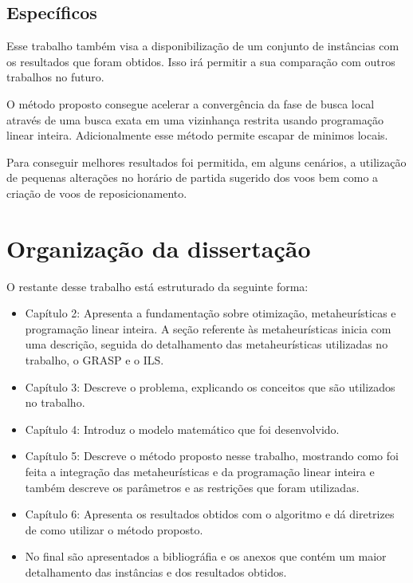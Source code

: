 \subsection{Específicos}

Esse trabalho também visa a disponibilização de um conjunto de instâncias com
os resultados que foram obtidos. Isso irá permitir a sua comparação com
outros trabalhos no futuro.

O método proposto consegue acelerar a convergência da fase de busca local
através de uma busca exata em uma vizinhança restrita usando programação
linear inteira. Adicionalmente esse método permite escapar de minimos locais.

Para conseguir melhores resultados foi permitida, em alguns cenários, a
utilização de pequenas alterações no horário de partida sugerido dos voos bem
como a criação de voos de reposicionamento.

\section {Organização da dissertação }

O restante desse trabalho está estruturado da seguinte forma:

\begin{itemize}

\item Capítulo 2: Apresenta a fundamentação sobre otimização, metaheurísticas
e programação linear inteira. A seção referente às metaheurísticas inicia
com uma descrição, seguida do detalhamento das metaheurísticas utilizadas no trabalho,
o GRASP e o ILS.


\item Capítulo 3: Descreve o problema, explicando os conceitos que são
utilizados no trabalho.

\item Capítulo 4: Introduz o modelo matemático que foi desenvolvido.

\item Capítulo 5: Descreve o método proposto nesse trabalho, mostrando como foi
feita a integração das metaheurísticas e da programação linear inteira e também descreve os parâmetros e as restrições que foram utilizadas.

\item Capítulo 6: Apresenta os resultados obtidos com o algoritmo e dá
diretrizes de como utilizar o método proposto.

\item No final são apresentados a bibliográfia e os anexos que contém um maior
detalhamento das instâncias e dos resultados obtidos.

\end{itemize}